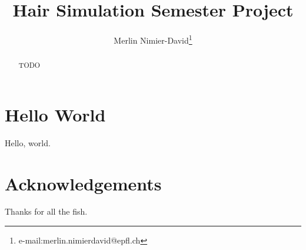 \documentclass[conference]{acmsiggraph/acmsiggraph}
\title{Hair Simulation Semester Project}
\author{Merlin Nimier-David\thanks{e-mail:merlin.nimierdavid@epfl.ch}}
\begin{document}

  \maketitle

  \begin{abstract}
    TODO
  \end{abstract}

  \begin{CRcatlist}
  \end{CRcatlist}
  \keywordlist
  \copyrightspace

  \section{Hello World}
  Hello, world.

  \section*{Acknowledgements}
    Thanks for all the fish.

  
  \nocite{*}
  
\end{document}
